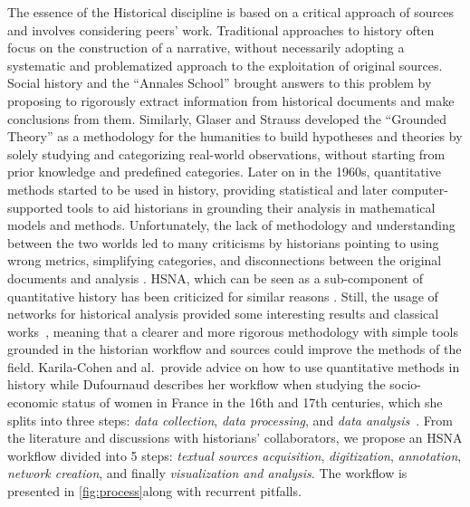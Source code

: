 The essence of the Historical discipline is based on a critical approach of sources and involves considering peers' work. Traditional approaches to history often focus on the construction of a narrative, without necessarily adopting a systematic and problematized approach to the exploitation of original sources.
Social history and the ``Annales School'' brought answers to this problem by proposing to rigorously extract information from historical documents and make conclusions from them.
Similarly, Glaser and Strauss developed the ``Grounded Theory'' \cite{glaserDiscoveryGroundedTheory2010} as a methodology for the humanities to build hypotheses and theories by solely studying and categorizing real-world observations, without starting from prior knowledge and predefined categories.
Later on in the 1960s, quantitative methods started to be used in history, providing statistical and later computer-supported tools to aid historians in grounding their analysis in mathematical models and methods. Unfortunately, the lack of methodology and understanding between the two worlds led to many criticisms by historians pointing to using wrong metrics, simplifying categories, and disconnections between the original documents and analysis \cite{karila-cohenNouvellesCuisinesHistoire2018, lemercierBackSourcesPracticing2021}.
HSNA, which can be seen as a sub-component of quantitative history has been criticized for similar reasons \cite{lemercier12FormalNetwork2015}. Still, the usage of networks for historical analysis provided some interesting results and classical works~\cite{padgettRobustActionRise1993}, meaning that a clearer and more rigorous methodology with simple tools grounded in the historian workflow and sources could improve the methods of the field. Karila-Cohen and al.\ provide advice on how to use quantitative methods in history \cite{karila-cohenNouvellesCuisinesHistoire2018} while
Dufournaud describes her workflow when studying the socio-economic status of women in France in the 16th and 17th centuries, which she splits into three steps: \textit{data collection}, \textit{data processing}, and \textit{data analysis}~\cite{dufournaudCommentRendreVisible2018}.
From the literature and discussions with historians' collaborators, we propose an HSNA workflow divided into 5 steps: \textit{textual sources acquisition}, \textit{digitization}, \textit{annotation}, \textit{network creation}, and finally \textit{visualization and analysis}. The workflow is presented in \autoref{fig:process}along with recurrent pitfalls.


